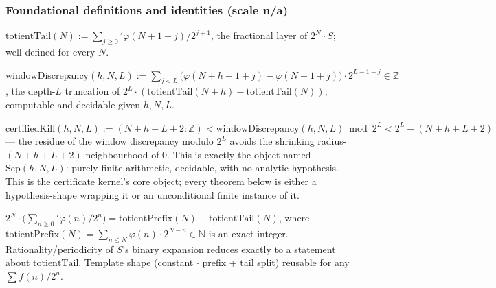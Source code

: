 \subsubsection{Foundational definitions and identities (scale n/a)}

\begin{defn}
$\mathrm{totientTail}(N) := \sum_{j\ge0}' \varphi(N+1+j)/2^{j+1}$, the fractional layer of $2^N\cdot S$; well-defined for every $N$.
\par\noindent{}   
\end{defn}

\begin{defn}
$\mathrm{windowDiscrepancy}(h,N,L) := \sum_{j<L} \big(\varphi(N+h+1+j) - \varphi(N+1+j)\big)\cdot 2^{L-1-j} \in \mathbb{Z}$, the depth-$L$ truncation of $2^L\cdot(\mathrm{totientTail}(N+h) - \mathrm{totientTail}(N))$; computable and decidable given $h,N,L$.
\par\noindent{}   
\end{defn}

\begin{defn}
$\mathrm{certifiedKill}(h,N,L) := (N+h+L+2:\mathbb{Z}) < \mathrm{windowDiscrepancy}(h,N,L) \bmod 2^L < 2^L - (N+h+L+2)$ — the residue of the window discrepancy modulo $2^L$ avoids the shrinking radius-$(N+h+L+2)$ neighbourhood of $0$. This is exactly the object named $\mathrm{Sep}(h,N,L)$: purely finite arithmetic, decidable, with no analytic hypothesis. This is the certificate kernel's core object; every theorem below is either a hypothesis-shape wrapping it or an unconditional finite instance of it.
\par\noindent{}   
\end{defn}

\begin{prop}
$2^N \cdot \Big(\sum_{n\ge0}' \varphi(n)/2^n\Big) = \mathrm{totientPrefix}(N) + \mathrm{totientTail}(N)$, where $\mathrm{totientPrefix}(N) = \sum_{n\le N}\varphi(n)\cdot 2^{N-n} \in \mathbb{N}$ is an exact integer. Rationality/periodicity of $S$'s binary expansion reduces exactly to a statement about $\mathrm{totientTail}$. Template shape (constant $\cdot$ prefix + tail split) reusable for any $\sum f(n)/2^n$.
\par\noindent{}   
\end{prop}

